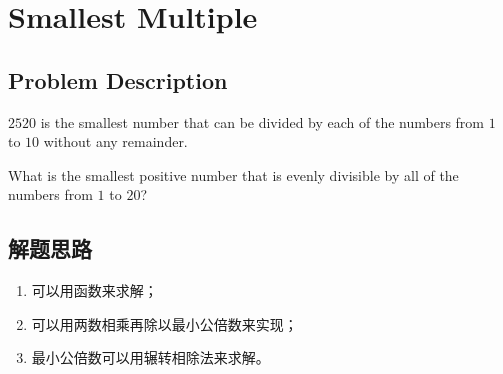 \chapter{Smallest Multiple}
\section{Problem Description}
\begin{tcolorbox}
$2520$ is the smallest number that can be divided by each of the numbers from $1$ to $10$ without any remainder.

What is the smallest positive number that is evenly divisible by all of the numbers from $1$ to $20$?
\end{tcolorbox}

\section{解题思路}
\begin{enumerate}
  \item 可以用函数来求解；
  \item {}可以用两数相乘再除以最小公倍数来实现；
  \item 最小公倍数可以用辗转相除法来求解。

\end{enumerate}
